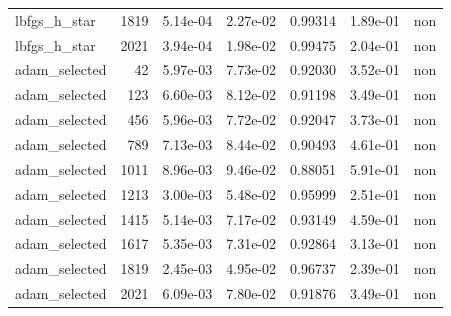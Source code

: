 \begin{longtable}{l r S[table-format=1.2e-2] S[table-format=1.2e-2] S[table-format=1.5] S[table-format=1.2e-2] c}
lbfgs\_h\_star & 1819 & 5.14e-04 & 2.27e-02 & 0.99314 & 1.89e-01 & non \\
lbfgs\_h\_star & 2021 & 3.94e-04 & 1.98e-02 & 0.99475 & 2.04e-01 & non \\
adam\_selected & 42 & 5.97e-03 & 7.73e-02 & 0.92030 & 3.52e-01 & non \\
adam\_selected & 123 & 6.60e-03 & 8.12e-02 & 0.91198 & 3.49e-01 & non \\
adam\_selected & 456 & 5.96e-03 & 7.72e-02 & 0.92047 & 3.73e-01 & non \\
adam\_selected & 789 & 7.13e-03 & 8.44e-02 & 0.90493 & 4.61e-01 & non \\
adam\_selected & 1011 & 8.96e-03 & 9.46e-02 & 0.88051 & 5.91e-01 & non \\
adam\_selected & 1213 & 3.00e-03 & 5.48e-02 & 0.95999 & 2.51e-01 & non \\
adam\_selected & 1415 & 5.14e-03 & 7.17e-02 & 0.93149 & 4.59e-01 & non \\
adam\_selected & 1617 & 5.35e-03 & 7.31e-02 & 0.92864 & 3.13e-01 & non \\
adam\_selected & 1819 & 2.45e-03 & 4.95e-02 & 0.96737 & 2.39e-01 & non \\
adam\_selected & 2021 & 6.09e-03 & 7.80e-02 & 0.91876 & 3.49e-01 & non \\
\end{longtable}
